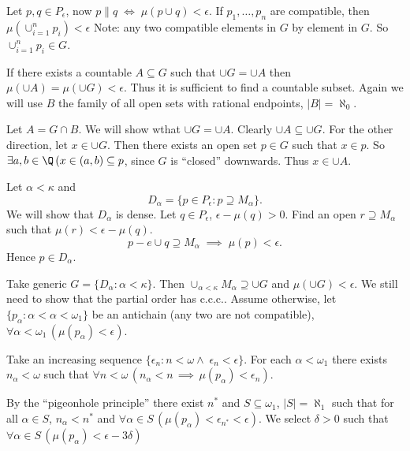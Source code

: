 \documentclass[11pt,pdftex,twoside,a4paper]{article}
\newcommand{\ccc}{c.c.c.}
\theoremstyle{definition}
\begin{document}
Let \(p,q\in P_\epsilon\), now \(p\| q\;\iff\; \mu(p\cup q)<\epsilon\).
If \(p_1,\ldots,p_n\) are compatible, then \(\mu(\cup_{i=1}^n p_i) < \epsilon\)
Note: any two compatible elements in $G$ by element in $G$.
So \(\cup_{i=1}^n p_i \in G\).

If there exists a countable \(A \subseteq G\) such that
\(\cup G = \cup A\) then \(\mu(\cup A) = \mu(\cup G) < \epsilon\).
Thus it is sufficient to find a countable subset.
Again we will use $B$ the family of all open sets with rational endpoints,
\(|B|=\aleph_0\).

Let \(A = G \cap B\). We will show wthat \(\cup G = \cup A\).
Clearly \(\cup A \subseteq \cup G\).
For the other direction, let \(x\in\cup G\).
Then there exists an open set \(p\in G\) such that \(x\in p\).
So \(\exists a,b\in\Q\,(x\in (a,b)\subseteq p\),
since $G$ is ``closed'' downwards. Thus \(x\in \cup A\).

Let \(\alpha<\kappa\) and 
\begin{equation*}
D_\alpha = \{p \in P_\epsilon : p \supseteq M_\alpha\}.
\end{equation*}
We will show that \(D_\alpha\) is dense.
Let \(q\in P_\epsilon\), \(\epsilon - \mu(q) > 0\).
Find an open \(r \supseteq M_\alpha\) such that \(\mu(r) < \epsilon - \mu(q)\).
\begin{equation*}
p - e \cup q \supseteq M_\alpha\;\implies\;\mu(p)<\epsilon.
\end{equation*}
Hence \(p\in D_\alpha\).

Take generic \(G = \{D_\alpha: \alpha < \kappa\}\).
Then \(\cup_{\alpha<\kappa}M_\alpha \supseteq \cup G\)
and \(\mu(\cup G)<\epsilon\).
We still need to show that the partial order has \ccc.
Assume otherwise, let \(\{p_\alpha: \alpha < \alpha < \omega_1\}\)
be an antichain (any two are not compatible),
\(\forall \alpha<\omega_1\,(\mu(p_\alpha)<\epsilon)\).

Take an increasing sequence
 \(\{\epsilon_n: n < \omega\land\; \epsilon_n<\epsilon\}\).
For each \(\alpha<\omega_1\) there exists \(n_\alpha<\omega\) 
such that 
 \(\forall n<\omega\,(n_\alpha<n\,\implies\,\mu(p_\alpha)<\epsilon_n)\).

By the ``pigeonhole principle'' there exist \(n^*\) and \(S\subseteq \omega_1\),
\(|S|=\aleph_1\) such that for all \(\alpha \in S\), \(n_\alpha<n^*\)
and \(\forall \alpha\in S\,(\mu(p_\alpha)<\epsilon_{n^*} < \epsilon)\).
We select \(\delta>0\)  such that 
\(\forall\alpha\in S\,(\mu(p_\alpha) < \epsilon - 3\delta)\)
\end{document}
